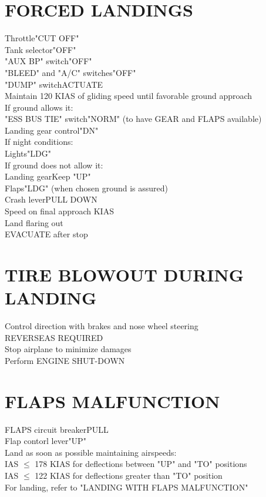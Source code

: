 \documentclass{article}
\begin{document}
\begin{multicols*}{2}
\section*{FORCED LANDINGS}
Throttle\dotfill "CUT OFF"\\
Tank selector\dotfill "OFF"\\
"AUX BP" switch\dotfill "OFF"\\
"BLEED" and "A/C" switches\dotfill "OFF"\\
"DUMP" switch\dotfill ACTUATE\\
Maintain 120 KIAS of gliding speed until favorable ground approach\\
If ground allows it:\\
\hspace*{6mm} "ESS BUS TIE" switch\dotfill "NORM" (to have GEAR and FLAPS available)\\
\hspace*{6mm} Landing gear control\dotfill "DN"\\
If night conditions:\\
\hspace*{6mm} Lights\dotfill "LDG"\\
If ground does not allow it:\\
\hspace*{6mm} Landing gear\dotfill Keep "UP"\\
\hspace*{6mm} Flaps\dotfill "LDG" (when chosen ground is assured)\\
Crash lever\dotfill PULL DOWN\\
Speed on final approach KIAS\\
Land flaring out\\
EVACUATE after stop
\section*{TIRE BLOWOUT DURING LANDING}
Control direction with brakes and nose wheel steering\\
REVERSE\dotfill AS REQUIRED\\
Stop airplane to minimize damages\\
Perform ENGINE SHUT-DOWN
\section*{FLAPS MALFUNCTION}
FLAPS circuit breaker\dotfill PULL\\
Flap contorl lever\dotfill "UP"\\
Land as soon as possible maintaining airspeeds:\\
\hspace*{6mm} IAS $\leq$ 178 KIAS for deflections between "UP" and "TO" positions\\
\hspace*{6mm} IAS $\leq$ 122 KIAS for deflections greater than "TO" position\\
For landing, refer to "LANDING WITH FLAPS MALFUNCTION"

\end{multicols*}
\end{document}
